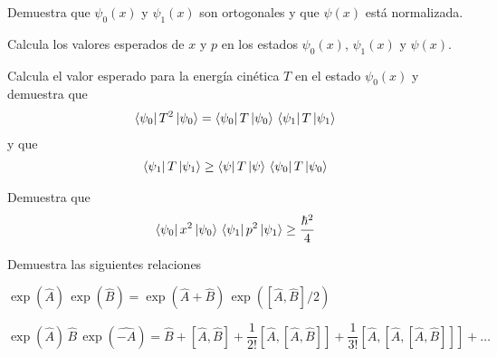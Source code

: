 \begin{milista}
\begin{milista}
\item Demuestra que $\psi_{0}(x)$ y $\psi_{1}(x)$ son ortogonales y que $\psi(x)$ está normalizada.
\item Calcula los valores esperados de $x$ y $p$ en los estados $\psi_{0}(x)$, $\psi_{1}(x)$ y $\psi(x)$.
\item Calcula el valor esperado para la energía cinética $T$ en el estado $\psi_{0}(x)$ y demuestra que
\begin{align*}
\bra{\psi_{0}} T^{2} \ket{\psi_{0}} = \bra{\psi_{0}} T \ket{\psi_{0}} \, \bra{\psi_{1}} T \ket{\psi_{1}}
\end{align*}
y que 
\begin{align*}
\bra{\psi_{1}} T \ket{\psi_{1}} \geq \bra{\psi} T \ket{\psi} \, \bra{\psi_{0}} T \ket{\psi_{0}}
\end{align*}
\item Demuestra que
\begin{align*}
\bra{\psi_{0}} x^{2} \ket{\psi_{0}} \, \bra{\psi_{1}} p^{2} \ket{\psi_{1}} \geq \dfrac{\hbar^{2}}{4}
\end{align*}
\end{milista}
\item Demuestra las siguientes relaciones
\begin{milista}
\item $\exp(\hat{A}) \, \exp(\hat{B}) = \exp(\hat{A} + \hat{B}) \, \exp([\hat{A}, \hat{B}]/2)$
\item $\exp(\hat{A}) \, \hat{B} \, \exp(\hat{-A}) = \hat{B} + [\hat{A}, \hat{B}] + \dfrac{1}{2!} [\hat{A}, [\hat{A}, \hat{B}]] + \dfrac{1}{3!} [\hat{A}, [ \hat{A}, [\hat{A}, \hat{B}]]] + \ldots$
\end{milista}
\end{milista}
